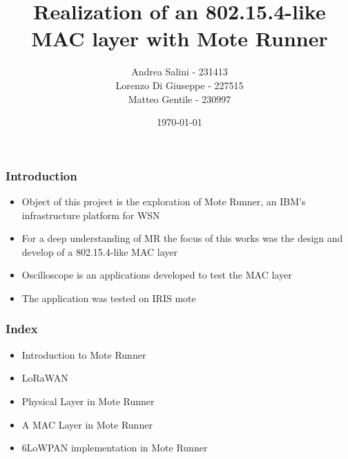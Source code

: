 \documentclass[12pt, compress]{beamer}
\title{Realization of an 802.15.4-like MAC layer with Mote Runner}
\subtitle{}
\date{\today}
\author{Andrea Salini - 231413 \\ Lorenzo Di Giuseppe - 227515 \\ Matteo Gentile - 230997}
\institute{DISIM - Università degli Studi dell’Aquila}
\begin{document}
  \maketitle
  
\begin{frame}[fragile]
  \frametitle{Introduction}
  \begin{itemize}
    \item Object of this project is the exploration of Mote Runner, an IBM’s infrastructure platform for WSN
    \item For a deep understanding of MR the focus of this works was the design and develop of a 802.15.4-like MAC layer
    \item Oscilloscope is an applications developed to test the MAC layer
    \item The application was tested on IRIS mote
  \end{itemize}
\end{frame}

\begin{frame}[fragile]
  \frametitle{Index}
  \begin{itemize}
    \item Introduction to Mote Runner
    \item LoRaWAN
    \item Physical Layer in Mote Runner
    \item A MAC Layer in Mote Runner
    \item 6LoWPAN implementation in Mote Runner
  \end{itemize}
\end{frame}







%
\end{document}
